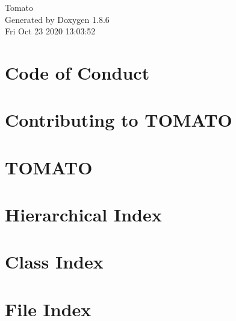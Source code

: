 \documentclass[twoside]{book}
\newcommand{\clearemptydoublepage}{%
  \newpage{\pagestyle{empty}\cleardoublepage}%
}
\begin{document}
\hypersetup{pageanchor=false}
\begin{titlepage}
\vspace*{7cm}
\begin{center}%
{\Large Tomato }\\
\vspace*{1cm}
{\large Generated by Doxygen 1.8.6}\\
\vspace*{0.5cm}
{\small Fri Oct 23 2020 13:03:52}\\
\end{center}
\end{titlepage}
\clearemptydoublepage
\tableofcontents
\clearemptydoublepage
{}
\hypersetup{pageanchor=true}

\chapter{Code of Conduct}
\label{md_codeofconduct}
\hypertarget{md_codeofconduct}{}

\chapter{Contributing to T\-O\-M\-A\-T\-O}
\label{md_contributing}
\hypertarget{md_contributing}{}

\chapter{T\-O\-M\-A\-T\-O}
\label{md__r_e_a_d_m_e}
\hypertarget{md__r_e_a_d_m_e}{}

\chapter{Hierarchical Index}

\chapter{Class Index}

\chapter{File Index}

\end{document}
